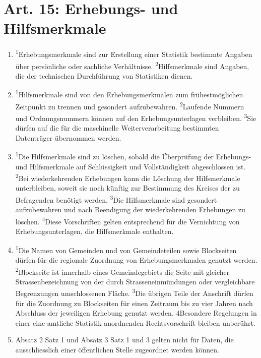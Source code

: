     \section{Art. 15: Erhebungs- und Hilfsmerkmale}
        \begin{enumerate}[label=(\arabic*)]
            \item \textsuperscript{1}Erhebungsmerkmale sind zur Erstellung einer Statistik bestimmte Angaben über persönliche oder sachliche Verhältnisse. \textsuperscript{2}Hilfsmerkmale sind Angaben, die der technischen Durchführung von Statistiken dienen.
            \item \textsuperscript{1}Hilfsmerkmale sind von den Erhebungsmerkmalen zum frühestmöglichen Zeitpunkt zu trennen und gesondert aufzubewahren. \textsuperscript{2}Laufende Nummern und Ordnungsnummern können auf den Erhebungsunterlagen verbleiben. \textsuperscript{3}Sie dürfen auf die für die maschinelle Weiterverarbeitung bestimmten Datenträger übernommen werden.
            \item \textsuperscript{1}Die Hilfsmerkmale sind zu löschen, sobald die Überprüfung der Erhebungs- und Hilfsmerkmale auf Schlüssigkeit und Vollständigkeit abgeschlossen ist. \textsuperscript{2}Bei wiederkehrenden Erhebungen kann die Löschung der Hilfsmerkmale unterbleiben, soweit sie noch künftig zur Bestimmung des Kreises der zu Befragenden benötigt werden. \textsuperscript{3}Die Hilfsmerkmale sind gesondert aufzubewahren und nach Beendigung der wiederkehrenden Erhebungen zu löschen. \textsuperscript{4}Diese Vorschriften gelten entsprechend für die Vernichtung von Erhebungsunterlagen, die Hilfsmerkmale enthalten.
            \item \textsuperscript{1}Die Namen von Gemeinden und von Gemeindeteilen sowie Blockseiten dürfen für die regionale Zuordnung von Erhebungsmerkmalen genutzt werden. \textsuperscript{2}Blockseite ist innerhalb eines Gemeindegebiets die Seite mit gleicher Strassenbezeichnung von der durch Strasseneinmündungen oder vergleichbare Begrenzungen umschlossenen Fläche. \textsuperscript{3}Die übrigen Teile der Anschrift dürfen für die Zuordnung zu Blockseiten für einen Zeitraum bis zu vier Jahren nach Abschluss der jeweiligen Erhebung genutzt werden. 4Besondere Regelungen in einer eine amtliche Statistik anordnenden Rechtsvorschrift bleiben unberührt.
            \item Absatz 2 Satz 1 und Absatz 3 Satz 1 und 3 gelten nicht für Daten, die ausschliesslich einer öffentlichen Stelle zugeordnet werden können.
        \end{enumerate}   
    
